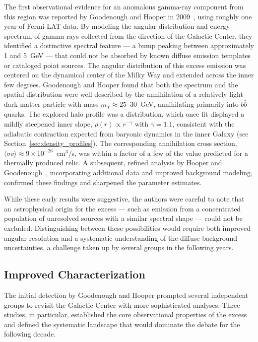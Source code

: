 The first observational evidence for an anomalous gamma-ray component from this region was reported by Goodenough and Hooper in 2009~\cite{Goodenough:2009gk}, using roughly one year of Fermi-LAT data.
By modeling the angular distribution and energy spectrum of gamma rays collected from the direction of the Galactic Center, they identified a distinctive spectral feature --- a bump peaking between approximately 1 and 5~GeV --- that could not be absorbed by known diffuse emission templates or cataloged point sources.
The angular distribution of this excess emission was centered on the dynamical center of the Milky Way and extended across the inner few degrees.
Goodenough and Hooper found that both the spectrum and the spatial distribution were well described by the annihilation of a relatively light dark matter particle with mass $m_\chi \approx 25$--$30$~GeV, annihilating primarily into $b\bar{b}$ quarks.
The explored halo profile was a \NFW distribution, which once fit displayed a mildly steepened inner slope, $\rho(r) \propto r^{-\gamma}$ with $\gamma = 1.1$, consistent with the adiabatic contraction expected from baryonic dynamics in the inner Galaxy (see Section~\ref{sec:density_profiles}).
The corresponding annihilation cross section, $\langle \sigma v \rangle \approx 9 \times 10^{-26}$~cm$^3$/s, was within a factor of a few of the value predicted for a thermally produced relic.
A subsequent, refined analysis by Hooper and Goodenough~\cite{Hooper:2010mq}, incorporating additional data and improved background modeling, confirmed these findings and sharpened the parameter estimates.

While these early results were suggestive, the authors were careful to note that an astrophysical origin for the excess --- such as emission from a concentrated population of unresolved sources with a similar spectral shape --- could not be excluded.
Distinguishing between these possibilities would require both improved angular resolution and a systematic understanding of the diffuse background uncertainties, a challenge taken up by several groups in the following years.

\subsection{Improved Characterization}
\label{sec:4.1.2}

The initial detection by Goodenough and Hooper prompted several independent groups to revisit the Galactic Center with more sophisticated analyses.
Three studies, in particular, established the core observational properties of the excess and defined the systematic landscape that would dominate the debate for the following decade.

